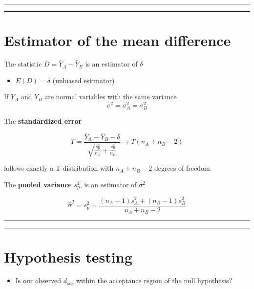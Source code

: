 \documentclass[
]{book}
\providecommand{\tightlist}{%
  \setlength{\itemsep}{0pt}\setlength{\parskip}{0pt}}
\begin{document}
\begin{center}\rule{0.5\linewidth}{0.5pt}\end{center}

\begin{center}\rule{0.5\linewidth}{0.5pt}\end{center}

\hypertarget{estimator-of-the-mean-difference}{%
\section{Estimator of the mean difference}\label{estimator-of-the-mean-difference}}

The statistic \(D=\bar{Y}_A-\bar{Y}_B\) is an estimator of \(\delta\)

\begin{itemize}
\tightlist
\item
  \(E(D)=\delta\) (unbiased estimator)
\end{itemize}

If \(Y_A\) and \(Y_B\) are normal variables with the same variance \[\sigma^2=\sigma^2_A=\sigma^2_B\]

The \textbf{standardized error}

\[T=\frac{\bar{Y}_A-\bar{Y}_B -\delta}{\sqrt{\frac{s_p^2}{n_A}+\frac{s_p^2}{n_B}}} \rightarrow T(n_A+n_B-2)\]

follows exactly a T-distribution with \(n_A+n_B-2\) degrees of freedom.

The \textbf{pooled variance} \(s_p^2\), is an estimator of \(\sigma^2\)

\[\hat{\sigma}^2=s_p^2= \frac{(n_A-1) s^2_A+(n_B-1) s^2_B}{n_A+n_B-2}\]

\begin{center}\rule{0.5\linewidth}{0.5pt}\end{center}

\begin{center}\rule{0.5\linewidth}{0.5pt}\end{center}

\hypertarget{hypothesis-testing-2}{%
\section{Hypothesis testing}\label{hypothesis-testing-2}}

\begin{itemize}
\tightlist
\item
  Is our observed \(d_{obs}\) within the acceptance region of the null hypothesis?
\end{itemize}
\end{document}
